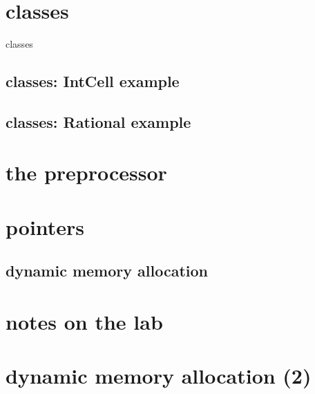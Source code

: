 

%

\section{classes}

\begin{frame}{classes}
\end{frame}

\subsection{classes: IntCell example}



\subsection{classes: Rational example}




\section{the preprocessor}



\section{pointers}



\subsection{dynamic memory allocation}

%





\section{notes on the lab}




\section{dynamic memory allocation (2)}


